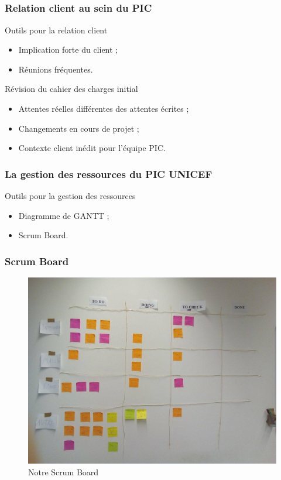 \speaker{\Pierre}
\subsection{} %

\begin{frame}
\frametitle{Relation client au sein du PIC}
	\begin{block}{Outils pour la relation client}
		\begin{itemize}
			\item Implication forte du client ;
			\item Réunions fréquentes.
		\end{itemize}      
	\end{block}
	\begin{block}{Révision du cahier des charges initial}
		\begin{itemize}
			\item Attentes réelles différentes des attentes écrites ;
			\item Changements en cours de projet ;
			\item Contexte client inédit pour l'équipe PIC.
		\end{itemize}      
	\end{block}
\end{frame}


\begin{frame}
\frametitle{La gestion des ressources du PIC UNICEF}
	\begin{block}{Outils pour la gestion des ressources}
		\begin{itemize}
			\item Diagramme de GANTT ;
			\item Scrum Board.
		\end{itemize}      
	\end{block}
\end{frame}


\begin{frame}
\frametitle{Scrum Board}
	\begin{figure}
		\includegraphics[scale=0.2]{images/kanban.jpg}
		\caption{Notre Scrum Board}
		\label{Kn}
	\end{figure}
\end{frame}
	

